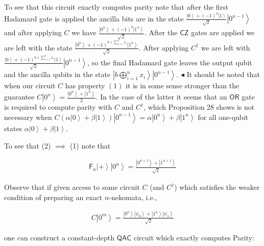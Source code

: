 \documentclass[10pt,a4paper]{article}
\begin{document}
To see that this circuit exactly computes parity note that after the first Hadamard gate is applied the ancilla bits are in the state $\frac{\left|0\right\rangle+(-1)^{b}\left|1\right\rangle}{\sqrt{2}}\left|0^{n-1}\right\rangle$ and after applying $C$ we have $\frac{\left|0^{n}\right\rangle+(-1)^{b}\left|1^{n}\right\rangle}{\sqrt{2}}$. After the $\mathsf{CZ}$ gates are applied we are left with the state $\frac{\left|0^{n}\right\rangle+(-1)^{b+\sum_{i=1}^{n}x_{i}}\left|1^{n}\right\rangle}{\sqrt{2}}$. After applying $C^{{\dagger}}$ we are left with $\frac{\left|0\right\rangle+(-1)^{b+\sum_{i=1}^{n}x_{i}}\left|1\right\rangle}{\sqrt{2}}\left|0^{n-1}\right\rangle$, so the final Hadamard gate leaves the output qubit and the ancilla qubits in the state $\left|b\bigoplus_{i=1}^{n}x_{i}\right\rangle\left|0^{n-1}\right\rangle$.
$\blacktriangleleft$
It should be noted that when our circuit $C$ has property $(1)$ it is in some sense stronger than the guarantee $C\left|0^{n}\right\rangle=\frac{\left|0^{n}\right\rangle+\left|1^{n}\right\rangle}{2}$. In the case of the latter it seems that an $\mathsf{OR}$ gate is required to compute parity with $C$ and $C^{{\dagger}}$, which Proposition 28 shows is not necessary when $C(\alpha\left|0\right\rangle+\beta\left|1\right\rangle)\left|0^{n-1}\right\rangle=\alpha\left|0^{n}\right\rangle+\beta\left|1^{n}\right\rangle$ for all one-qubit states $\alpha\left|0\right\rangle+\beta\left|1\right\rangle$.\par




To see that (2) $\implies$ (1) note that\par


\[\begin{gathered}
\mathsf{F}_{n}\left|+\right\rangle\left|0^{n}\right\rangle=\frac{\left|0^{n+1}\right\rangle+\left|1^{n+1}\right\rangle}{\sqrt{2}}
\end{gathered}\]


Observe that if given access to some circuit $C$ (and $C^{{\dagger}}$) which satisfies the weaker condition of preparing an exact $n$-nekomata, i.e.,\par


\[\begin{gathered}
\displaystyle C\left|0^{m}\right\rangle=\frac{\left|0^{n}\right\rangle\left|\psi_{0}\right\rangle+\left|1^{n}\right\rangle\left|\psi_{1}\right\rangle}{\sqrt{2}}
\end{gathered}\]


one can construct a constant-depth ${\mathsf{QAC}}$ circuit which exactly computes Parity:\par
\end{document}
